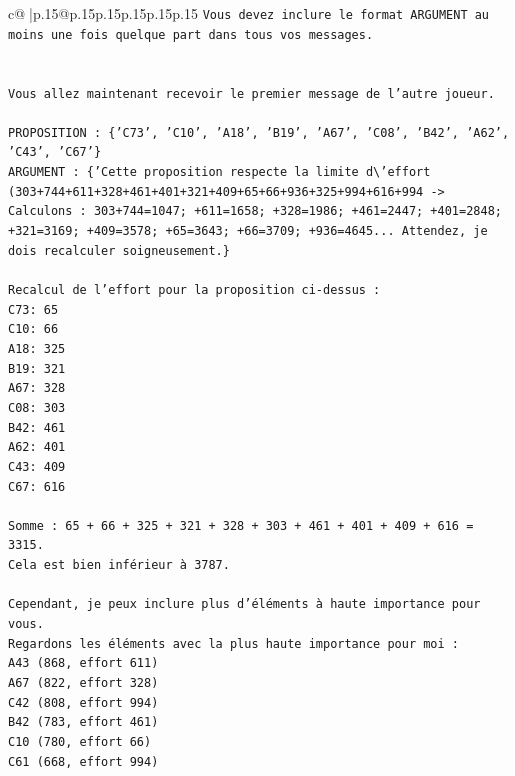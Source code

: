 \documentclass{article}
\begin{document}
{\begin{supertabular}{c@{$\;$}|p{.15\linewidth}@{}p{.15\linewidth}p{.15\linewidth}p{.15\linewidth}p{.15\linewidth}p{.15\linewidth}}
{{{\texttt{Vous devez inclure le format ARGUMENT au moins une fois quelque part dans tous vos messages.} \\
\\ 
\\ 
\texttt{Vous allez maintenant recevoir le premier message de l'autre joueur.} \\
\\ 
\texttt{PROPOSITION : \{'C73', 'C10', 'A18', 'B19', 'A67', 'C08', 'B42', 'A62', 'C43', 'C67'\}} \\
\texttt{ARGUMENT : \{'Cette proposition respecte la limite d\textbackslash{}'effort (303+744+611+328+461+401+321+409+65+66+936+325+994+616+994 {-}> Calculons : 303+744=1047; +611=1658; +328=1986; +461=2447; +401=2848; +321=3169; +409=3578; +65=3643; +66=3709; +936=4645... Attendez, je dois recalculer soigneusement.\}} \\
\\ 
\texttt{Recalcul de l'effort pour la proposition ci{-}dessus :} \\
\texttt{C73: 65} \\
\texttt{C10: 66} \\
\texttt{A18: 325} \\
\texttt{B19: 321} \\
\texttt{A67: 328} \\
\texttt{C08: 303} \\
\texttt{B42: 461} \\
\texttt{A62: 401} \\
\texttt{C43: 409} \\
\texttt{C67: 616} \\
\\ 
\texttt{Somme : 65 + 66 + 325 + 321 + 328 + 303 + 461 + 401 + 409 + 616 = 3315.} \\
\texttt{Cela est bien inférieur à 3787.} \\
\\ 
\texttt{Cependant, je peux inclure plus d'éléments à haute importance pour vous.} \\
\texttt{Regardons les éléments avec la plus haute importance pour moi :} \\
\texttt{A43 (868, effort 611)} \\
\texttt{A67 (822, effort 328)} \\
\texttt{C42 (808, effort 994)} \\
\texttt{B42 (783, effort 461)} \\
\texttt{C10 (780, effort 66)} \\
\texttt{C61 (668, effort 994)} \\
}}}
\end{supertabular}}
\end{document}
